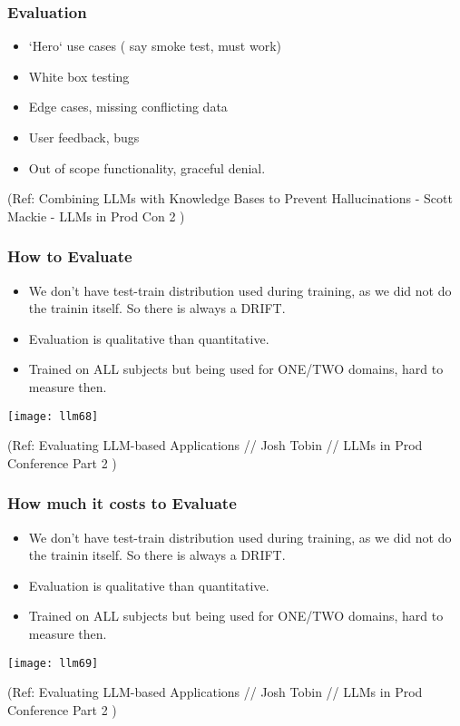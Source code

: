 \begin{frame}[fragile]\frametitle{Evaluation}

\begin{itemize}
\item `Hero` use cases ( say smoke test, must work)
\item White box testing
\item Edge cases, missing conflicting data
\item User feedback, bugs
\item Out of scope functionality, graceful denial.
\end{itemize}

{\tiny (Ref: Combining LLMs with Knowledge Bases to Prevent Hallucinations - Scott Mackie - LLMs in Prod Con 2 )}

\end{frame}

\begin{frame}[fragile]\frametitle{How to Evaluate}

\begin{itemize}
\item We don't have test-train distribution used during training, as we did not do the trainin itself. So there is always a DRIFT.
\item Evaluation is qualitative than quantitative.
\item Trained on ALL subjects but being used for ONE/TWO domains, hard to measure then.
\end{itemize}

\begin{center}
\texttt{[image: llm68]}
\end{center}		


{\tiny (Ref: Evaluating LLM-based Applications // Josh Tobin // LLMs in Prod Conference Part 2 )}

\end{frame}

\begin{frame}[fragile]\frametitle{How much it costs to Evaluate}

\begin{itemize}
\item We don't have test-train distribution used during training, as we did not do the trainin itself. So there is always a DRIFT.
\item Evaluation is qualitative than quantitative.
\item Trained on ALL subjects but being used for ONE/TWO domains, hard to measure then.
\end{itemize}

\begin{center}
\texttt{[image: llm69]}
\end{center}		


{\tiny (Ref: Evaluating LLM-based Applications // Josh Tobin // LLMs in Prod Conference Part 2 )}

\end{frame}

